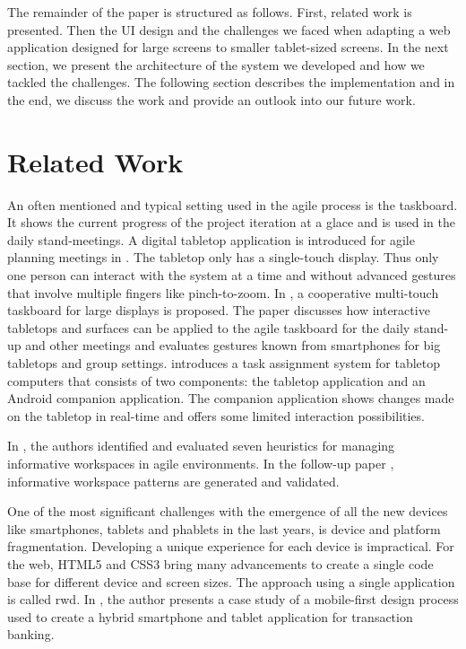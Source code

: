 \documentclass{sigchi}
\begin{document}
The remainder of the paper is structured as follows.
First, related work is presented.
Then the UI design and the challenges we faced when adapting a web application designed for large screens to smaller tablet-sized screens.
In the next section, we present the architecture of the system we developed and how we tackled the challenges.
The following section describes the implementation and in the end, we discuss the work and provide an outlook into our future work.

\section{Related Work}
An often mentioned and typical setting used in the agile process is the taskboard.
It shows the current progress of the project iteration at a glace and is used in the daily stand-meetings. 
A digital tabletop application is introduced for agile planning meetings in \cite{Ghanam:4599452}. 
The tabletop only has a single-touch display. 
Thus only one person can interact with the system at a time and without advanced gestures that involve multiple fingers like pinch-to-zoom.
In \cite{Rubart:2014:CMS:2669485.2669551}, a cooperative multi-touch taskboard for large displays is proposed. 
The paper discusses how interactive tabletops and surfaces can be applied to the agile taskboard for the daily stand-up and other meetings and evaluates gestures known from smartphones for big tabletops and group settings.
\cite{Haas:2014:TAV:2669485.2669538} introduces a task assignment system for tabletop computers that consists of two components: the tabletop application and an Android companion application.
The companion application shows changes made on the tabletop in real-time and offers some limited interaction possibilities.

In \cite{deMelo:6005497}, the authors identified and evaluated seven heuristics for managing informative workspaces in agile environments.
In the follow-up paper \cite{deMelo:6480421}, informative workspace patterns are generated and validated.

One of the most significant challenges with the emergence of all the new devices like smartphones, tablets and phablets in the last years, is device and platform fragmentation.
Developing a unique experience for each device is impractical.
For the web, HTML5 and CSS3 bring many advancements to create a single code base for different device and screen sizes.
The approach using a single application is called \gls{rwd}.
In \cite{Pandey:2013:RDT:2525194.2525271}, the author presents a case study of a mobile-first design process used to create a hybrid smartphone and tablet application for transaction banking.
\end{document}

